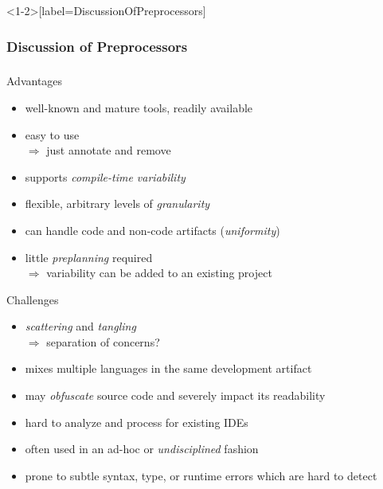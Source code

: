 \newcommand{\MajorChallengesOfPreprocessors}{
	\item \emph{scattering} and \emph{tangling}\\
	$\Rightarrow$ separation of concerns?
	\item mixes multiple languages in the same development artifact
	\item may \emph{obfuscate} source code and severely impact its readability
	\item hard to analyze and process for existing IDEs
	\item often used in an ad-hoc or \emph{undisciplined} fashion
	\item prone to subtle syntax, type, or runtime errors which are hard to detect \mysource{\lectureinteractions--\lecturetesting}
}
\begin{frame}<1-2>[label=DiscussionOfPreprocessors]
	\frametitle<1-2>{Discussion of Preprocessors}
	\frametitle<3>{\myframetitle}
	\begin{mycolumns}
		\begin{note}{Advantages}
			\begin{itemize}
				\item well-known and mature tools, readily available
				\item easy to use\\
				$\Rightarrow$ just annotate and remove
				\item supports \emph{compile-time variability}
				\item flexible, arbitrary levels of \emph{granularity}
				\item can handle code and non-code artifacts (\emph{uniformity})
				\item little \emph{preplanning} required\\
				$\Rightarrow$ variability can be added to an existing project
			\end{itemize}
		\end{note}
	\mynextcolumn
		\begin{note}{Challenges}
			\begin{itemize}
				\MajorChallengesOfPreprocessors
			\end{itemize}
		\end{note}
	\end{mycolumns}
\end{frame}

